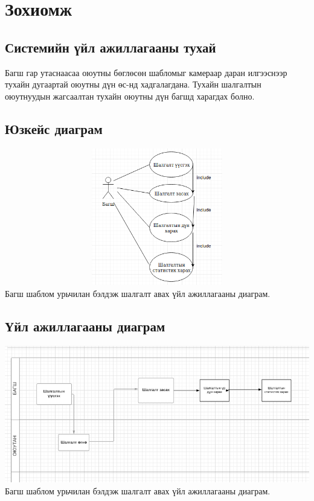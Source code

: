 
\section{Зохиомж} 
	
	\subsection{Системийн үйл ажиллагааны тухай}
	\begin{flushleft}
	Багш гар утаснаасаа оюутны бөглөсөн шабломыг камераар даран илгээснээр тухайн дугаартай оюутны дүн өс-нд хадгалагдана. Тухайн шалгалтын оюутнуудын жагсаалтан тухайн оюутны дүн багшд харагдах болно.
	\end{flushleft}
	\subsection{Юзкейс диаграм}
	\begin{flushleft}
	\includegraphics[width=15cm,height=6cm, scale=0.5]{Figures/cusecase.png}
	\hspace*{0pt}\hfill Багш шаблом урьчилан бэлдэж шалгалт авах үйл ажиллагааны диаграм.
	\newline
	\newline
	\end{flushleft}
	
	\subsection{Үйл ажиллагааны диаграм}
	\begin{flushleft}
	\includegraphics[width=15cm,height=6cm, scale=0.5]{Figures/cactivity.png}
	\hspace*{0pt}\hfill Багш шаблом урьчилан бэлдэж шалгалт авах үйл ажиллагааны диаграм.
	\newline
	\newline
	\end{flushleft}
	
